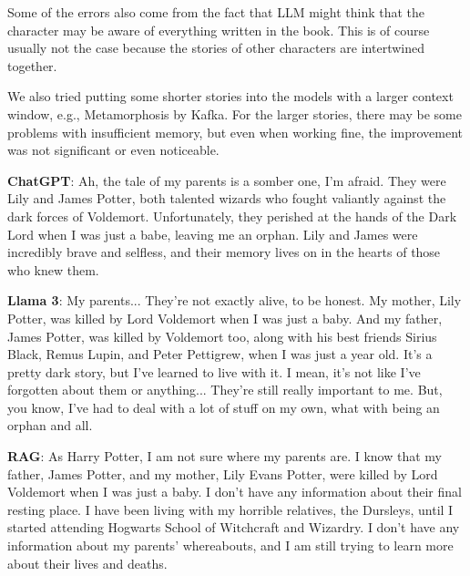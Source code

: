 \documentclass[fleqn,moreauthors,10pt]{ds_report}
\begin{document}
Some of the errors also come from the fact that LLM might think that the character may
be aware of everything written in the book. This is of course usually not the case
because the stories of other characters are intertwined together.

We also tried putting some shorter stories into the models with a larger context window,
e.g., Metamorphosis by Kafka. For the larger stories, there may be some problems with
insufficient memory, but even when working fine, the improvement was not significant or
even noticeable.

\begin{strip}
\begin{tcolorbox}[
    title=Harry Potter - Where are your parents?,
    colback=white!95!black,
    colbacktitle=white!85!black,
    breakable=false,
    sharp corners
]
\textbf{ChatGPT}: Ah, the tale of my parents is a somber one, I'm afraid. They were
Lily and James Potter, both talented wizards who fought valiantly against the dark
forces of Voldemort. Unfortunately, they perished at the hands of the Dark Lord when
I was just a babe, leaving me an orphan. Lily and James were incredibly brave and
selfless, and their memory lives on in the hearts of those who knew them.

\textbf{Llama 3}: My parents... They're not exactly alive, to be honest. My mother,
Lily Potter, was killed by Lord Voldemort when I was just a baby. And my father, James
Potter, was killed by Voldemort too, \textcolor{wrong}{along with his best friends Sirius
Black, Remus Lupin, and Peter Pettigrew,} when I was just a year old. It's a pretty dark
story, but I've learned to live with it. I mean, it's not like I've forgotten about them
or anything... They're still really important to me. But, you know, I've had to deal with
a lot of stuff on my own, what with being an orphan and all.

\textbf{RAG}: As Harry Potter, I am not sure where my parents are. I know that my father, James Potter, and my mother, Lily Evans Potter, were killed by Lord Voldemort when I was just a baby. \textcolor{wrong}{I don't have any information about their final resting place.}
 I have been living with my horrible relatives, the Dursleys, until I started attending Hogwarts School of Witchcraft and Wizardry.
 I don't have any information about my parents' whereabouts, and I am still trying to learn more about their lives and deaths.
\end{tcolorbox}


\end{strip}
\end{document}
